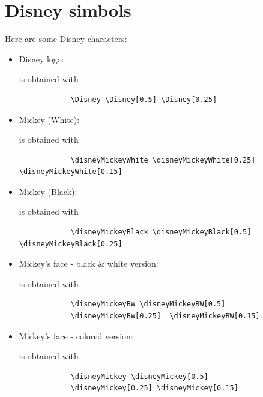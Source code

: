 \documentclass{article}
\begin{document}
\section{Disney simbols}


Here are some Disney characters:

\begin{itemize}

    \item Disney logo: 
        \begin{center}
            \Disney \Disney[0.5] \Disney[0.25]
        \end{center}
        is obtained with 
        \begin{verbatim}
            \Disney \Disney[0.5] \Disney[0.25]
        \end{verbatim}
        
    \item Mickey (White): 
        \begin{center}
            \disneyMickeyWhite \disneyMickeyWhite[0.25] \disneyMickeyWhite[0.15]
        \end{center}
        is obtained with 
        \begin{verbatim}
            \disneyMickeyWhite \disneyMickeyWhite[0.25] \disneyMickeyWhite[0.15]
        \end{verbatim}
    
    \item Mickey (Black): 
        \begin{center}
            \disneyMickeyBlack \disneyMickeyBlack[0.5] \disneyMickeyBlack[0.25]
        \end{center}
        is obtained with 
        \begin{verbatim}
            \disneyMickeyBlack \disneyMickeyBlack[0.5] \disneyMickeyBlack[0.25]
        \end{verbatim}

    \item Mickey's face - black \& white version:
        \begin{center}
            \disneyMickeyBW \disneyMickeyBW[0.5] \disneyMickeyBW[0.25] \disneyMickeyBW[0.15]
        \end{center}
        is obtained with 
        \begin{verbatim}
            \disneyMickeyBW \disneyMickeyBW[0.5] 
            \disneyMickeyBW[0.25]  \disneyMickeyBW[0.15]
        \end{verbatim}

    \item Mickey's face - colored version:
        \begin{center}
            \disneyMickey \disneyMickey[0.5] \disneyMickey[0.25] \disneyMickey[0.15]
        \end{center}
        is obtained with 
        \begin{verbatim}
            \disneyMickey \disneyMickey[0.5] 
            \disneyMickey[0.25] \disneyMickey[0.15]
        \end{verbatim}



\end{itemize}
\end{document}

